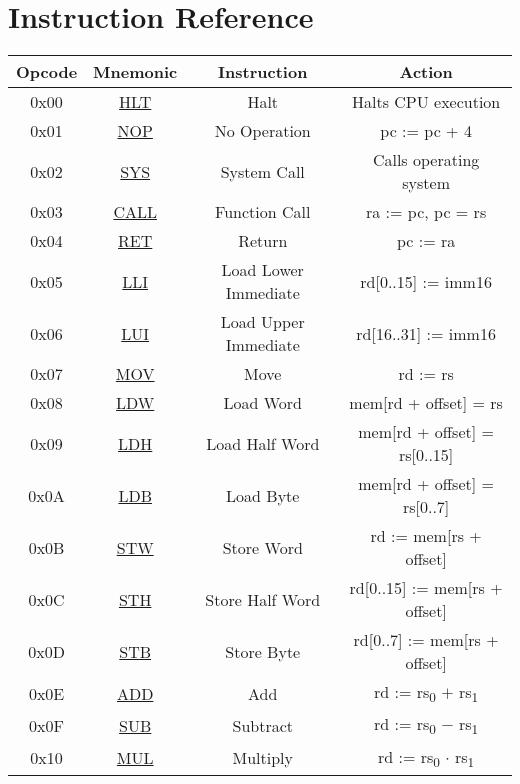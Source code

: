 \section{Instruction Reference}

\begin{center}
	\begin{tabular}{|c|c|c|c|}
		\hline
		\textbf{Opcode} & \textbf{Mnemonic} & \textbf{Instruction} & \textbf{Action}\\
		\hline
		0x00 & \hyperref[sec:HLT]{HLT} & Halt & Halts CPU execution\\
		\hline
		0x01 & \hyperref[sec:NOP]{NOP} & No Operation & pc := pc + 4\\
		\hline
		0x02 & \hyperref[sec:SYS]{SYS} & System Call & Calls operating system\\
		\hline
		0x03 & \hyperref[sec:CALL]{CALL} & Function Call & ra := pc, pc = rs\\
		\hline
		0x04 & \hyperref[sec:RET]{RET} & Return & pc := ra\\
		\hline
		\hline
		0x05 & \hyperref[sec:LLI]{LLI} & Load Lower Immediate & rd[0..15] := imm16\\
		\hline
		0x06 & \hyperref[sec:LUI]{LUI} & Load Upper Immediate & rd[16..31] := imm16\\
		\hline
		0x07 & \hyperref[sec:MOV]{MOV} & Move & rd := rs\\
		\hline
		\hline
		0x08 & \hyperref[sec:LDW]{LDW} & Load Word & mem[rd + offset] = rs\\
		\hline
		0x09 & \hyperref[sec:LDH]{LDH} & Load Half Word & mem[rd + offset] = rs[0..15]\\
		\hline
		0x0A & \hyperref[sec:LDB]{LDB} & Load Byte & mem[rd + offset] = rs[0..7]\\
		\hline
		0x0B & \hyperref[sec:STW]{STW} & Store Word & rd := mem[rs + offset]\\
		\hline
		0x0C & \hyperref[sec:STH]{STH} & Store Half Word & rd[0..15] := mem[rs + offset]\\
		\hline
		0x0D & \hyperref[sec:STB]{STB} & Store Byte & rd[0..7] := mem[rs + offset]\\
		\hline
		\hline
		0x0E & \hyperref[sec:ADD]{ADD} & Add & rd := rs\textsubscript{0} $+$ rs\textsubscript{1}\\
		\hline
		0x0F & \hyperref[sec:SUB]{SUB} & Subtract & rd := rs\textsubscript{0} $-$ rs\textsubscript{1}\\
		\hline
		0x10 & \hyperref[sec:MUL]{MUL} & Multiply & rd := rs\textsubscript{0} $\cdot$ rs\textsubscript{1}\\

\end{tabular}
\end{center}
